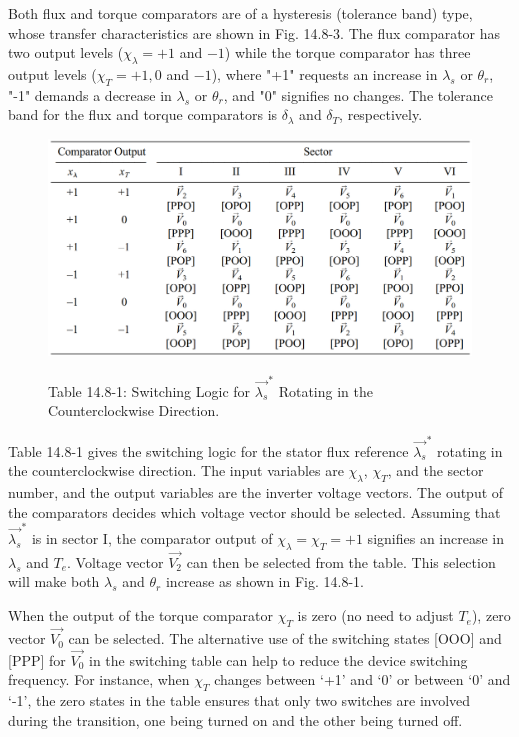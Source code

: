 \documentclass[letterpaper,12pt]{article}
\begin{document}
Both flux and torque comparators are of a hysteresis (tolerance band) type, whose transfer characteristics are shown in Fig. 14.8-3. The flux comparator has two output levels ($\chi_\lambda = +1$ and $-1$) while the torque comparator has three output levels ($\chi_T = +1, 0$ and $-1$), where "+1" requests an increase in $\lambda_s$ or $\theta_r$, "-1" demands a decrease in $\lambda_s$ or $\theta_r$, and "0" signifies no changes. The tolerance band for the flux and torque comparators is $\delta_\lambda$ and $\delta_T$, respectively.

\begin{figure}[h]
\centering
\caption{Table 14.8-1: Switching Logic for $\vec{\lambda_s}^*$ Rotating in the Counterclockwise Direction.}
\includegraphics[scale=0.4]{graficos/tabla_14_8_1.png}
\label{tab:14.8-1}
\end{figure}
\FloatBarrier

Table 14.8-1 gives the switching logic for the stator flux reference $\vec{\lambda_s}^*$ rotating in the counterclockwise direction. The input variables are $\chi_\lambda$, $\chi_T$, and the sector number, and the output variables are the inverter voltage vectors. The output of the comparators decides which voltage vector should be selected. Assuming that $\vec{\lambda_s}^*$ is in sector I, the comparator output of $\chi_\lambda = \chi_T = +1$ signifies an increase in $\lambda_s$ and $T_e$. Voltage vector $\vec{V_2}$ can then be selected from the table. This selection will make both $\lambda_s$ and $\theta_r$ increase as shown in Fig. 14.8-1.

When the output of the torque comparator $\chi_T$ is zero (no need to adjust $T_e$), zero vector $\vec{V_0}$ can be selected. The alternative use of the switching states [OOO] and [PPP] for $\vec{V_0}$ in the switching table can help to reduce the device switching frequency. For instance, when $\chi_T$ changes between ‘+1’ and ‘0’ or between ‘0’ and ‘-1’, the zero states in the table ensures that only two switches are involved during the transition, one being turned on and the other being turned off.
\end{document}

